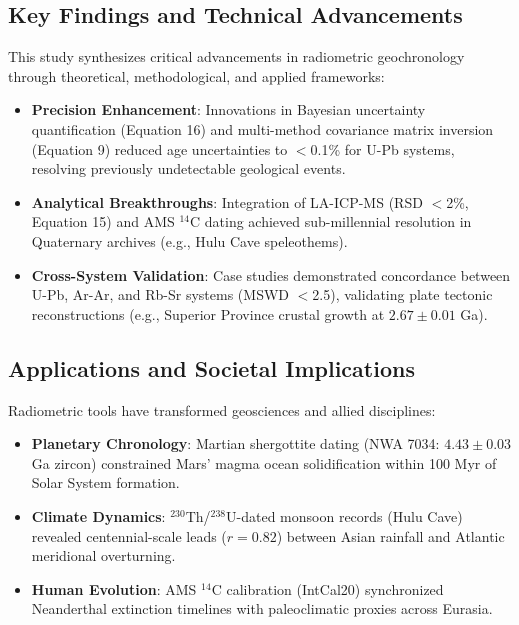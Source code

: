 \documentclass{article}
\begin{document}
\subsection{Key Findings and Technical Advancements}
This study synthesizes critical advancements in radiometric geochronology through theoretical, methodological, and applied frameworks:  
\begin{itemize}  
\item \textbf{Precision Enhancement}: Innovations in Bayesian uncertainty quantification (Equation 16) and multi-method covariance matrix inversion (Equation 9) reduced age uncertainties to $<$0.1\% for U-Pb systems, resolving previously undetectable geological events.  
\item \textbf{Analytical Breakthroughs}: Integration of LA-ICP-MS (RSD $<$2\%, Equation 15) and AMS $^{14}$C dating achieved sub-millennial resolution in Quaternary archives (e.g., Hulu Cave speleothems).  
\item \textbf{Cross-System Validation}: Case studies demonstrated concordance between U-Pb, Ar-Ar, and Rb-Sr systems (MSWD $<$2.5), validating plate tectonic reconstructions (e.g., Superior Province crustal growth at $2.67 \pm 0.01$ Ga).  
\end{itemize}

\subsection{Applications and Societal Implications}
Radiometric tools have transformed geosciences and allied disciplines:  
\begin{itemize}  
\item \textbf{Planetary Chronology}: Martian shergottite dating (NWA 7034: $4.43 \pm 0.03$ Ga zircon) constrained Mars' magma ocean solidification within 100 Myr of Solar System formation.  
\item \textbf{Climate Dynamics}: $^{230}$Th/$^{238}$U-dated monsoon records (Hulu Cave) revealed centennial-scale leads ($r=0.82$) between Asian rainfall and Atlantic meridional overturning.  
\item \textbf{Human Evolution}: AMS $^{14}$C calibration (IntCal20) synchronized Neanderthal extinction timelines with paleoclimatic proxies across Eurasia.  
\end{itemize}
\end{document}
